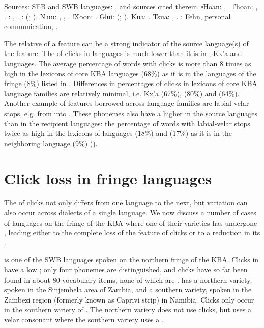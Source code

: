 \documentclass[output=paper
,newtxmath
,modfonts
,nonflat]{langsci/langscibook}
\begin{document}
Sources: SEB and SWB languages: \citet{Pakendorf2017}, and sources cited therein. ǂHoan: \citet{Collins2014}, \citet{Gruber1975}. ǀ’hoan: \citet{Dickens1994}, \citet{Miller-Ockhuizen2003}. : \citet[47]{Brugman2009}, \citet{Haacke2002}. : \citeauthor{Visser2001} (\citeyear{Visser2001}; \citeyear{Visser2013}). Nǀuu: \citet{Miller2014}, \citet{Miller2009}, \citet{Miller2007}. !Xoon: \citet{Traill1985,Traill1994}. Gǀui: \citeauthor{Nakagawa1996} (\citeyear{Nakagawa1996}; \citeyear{Nakagawa2013}). Kua: \citet{Chebanne2014}. Tsua: \citet{Mathes2016}, \citet{Chebanne2013}. : Fehn, personal communication, \citet{Vossen2013}. 

The relative  of a feature can be a strong indicator of the source language(s) of the feature. The  of clicks in  languages is much lower than it is in , Kx'a and  languages. The average percentage of words with clicks is more than 8 times as high in the lexicons of core KBA languages (68\%) as it is in the languages of the fringe (8\%) listed in . Differences in percentages of clicks in lexicons of core KBA language families are relatively minimal, i.e. Kx'a (67\%),  (80\%) and  (64\%). Another example of features borrowed across language families are labial-velar stops, e.g. from  into . These phonemes also have a higher  in the source languages than in the recipient languages: the percentage of words with labial-velar stops twice as high in the lexicons of  languages  (18\%) and  (17\%) as it is in the neighboring  language  (9\%) (\citealt{BostoenDonzo2013}). 

\section{Click loss in fringe languages}\label{sec:sands:3}

The  of clicks not only differs from one language to the next, but variation can also occur across dialects of a single language. We now discuss a number of cases of  languages on the fringe of the KBA where one of their varieties has undergone , leading either to the complete loss of the feature of clicks or to a reduction in its . 

 is one of the SWB  languages spoken on the northern fringe of the KBA. Clicks in  have a low ; only four  phonemes are distinguished, and clicks have so far been found in about 80 vocabulary items, none of which are .  has a northern variety, spoken in the Sinjembela area of Zambia, and a southern variety, spoken in the Zambezi region (formerly known as Caprivi strip) in Namibia. Clicks only occur in the southern variety of . The northern variety does not use clicks, but uses a velar consonant where the southern variety uses a .
\end{document}
